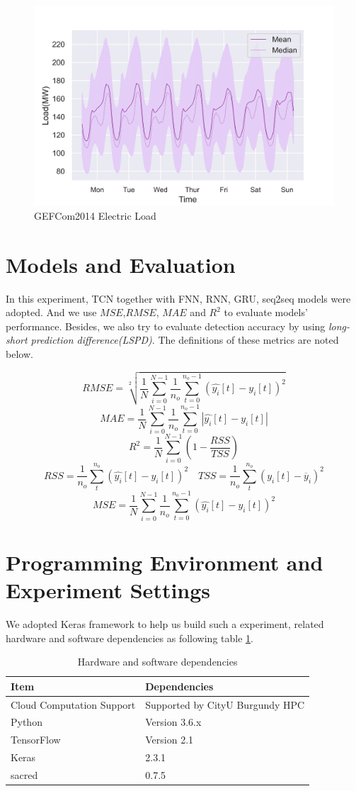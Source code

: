 \begin{figure}[H]
    \includegraphics[width=\textwidth]{../Figures/gef2014.PNG}
    \caption{GEFCom2014 Electric Load}
    \label{fig:gefc2014}
\end{figure}

\section{Models and Evaluation}
In this experiment, TCN together with FNN, RNN, GRU, seq2seq models were adopted. And we use $MSE$,$RMSE$, $MAE$ and $R^2$ to evaluate models' performance. Besides, we also try to evaluate detection accuracy by using \textit{long-short prediction difference(LSPD)}. The definitions of these metrics are noted below.

$$RMSE = \sqrt[2]{\frac{1}{N}\sum_{i=0}^{N-1}\frac{1}{n_o}\sum_{t=0}^{n_o-1}(\hat{y_i}[t]-y_i[t])^2} $$
$$MAE = \frac{1}{N}\sum_{i=0}^{N-1}\frac{1}{n_o}\sum_{t=0}^{n_o-1}|\hat{y_i}[t]-y_i[t]|$$
$$R^2 = \frac{1}{N}\sum_{i=0}^{N-1}(1- \frac{RSS}{TSS})$$
$$RSS=\frac{1}{n_o}\sum_{t}^{n_o}(\hat{y_i}[t]-y_i[t])^2 \quad TSS= \frac{1}{n_o}\sum_{t}^{n_o}(y_i[t] - \overline{y}_i)^2 $$
$$MSE = \frac{1}{N}\sum_{i=0}^{N-1}\frac{1}{n_o}\sum_{t=0}^{n_o-1}(\hat{y_i}[t]-y_i[t])^2$$


\section{Programming Environment and Experiment Settings}
We adopted Keras framework to help us build such a experiment, related hardware and software dependencies as following table \ref{tab:dependencies}. 

\begin{table}[H]
\centering
\caption{Hardware and software dependencies}
\begin{tabular}{l l}
\toprule
\textbf{Item} & \textbf{Dependencies}  \\
\midrule
Cloud Computation Support & Supported by CityU Burgundy HPC\\
Python & Version 3.6.x  \\
TensorFlow& Version 2.1 \\
Keras& 2.3.1 \\
sacred& 0.7.5 \\
\bottomrule
\end{tabular}
\label{tab:dependencies}
\end{table}

